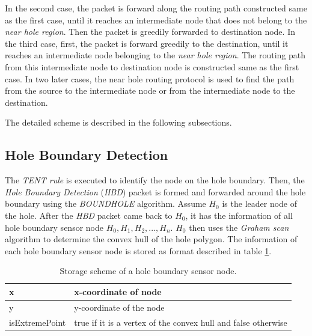 In the second case, the packet is forward along the routing path constructed same as the first case, until it reaches an intermediate node that does not belong to the \emph{near hole region}. Then the packet is greedily forwarded to destination node. In the third case, first, the packet is forward greedily to the destination, until it reaches an intermediate node belonging to the \emph{near hole region}. The routing path from this intermediate node to destination node is constructed same as the first case. In two later cases, the near hole routing protocol is used to find the path from the source to the intermediate node or from the intermediate node to the destination.

The detailed scheme is described in the following subsections.

\subsection{Hole Boundary Detection}
The \emph{TENT rule} is executed to identify the node on the hole boundary. Then, the \emph{Hole Boundary Detection} (\emph{HBD}) packet is formed and forwarded around the hole boundary using the \emph{BOUNDHOLE} algorithm. Assume $H_0$ is the leader node of the hole. After the \emph{HBD} packet came back to $H_0$, it has the information of all hole boundary sensor node $H_0, H_1, H_2, ..., H_n$. $H_0$ then uses the \emph{Graham scan} algorithm to determine the convex hull of the hole polygon. The information of each hole boundary sensor node is stored as format described in table \ref{table-node-info}.

\begin{table}[!htb]
\centering
\caption{Storage scheme of a hole boundary sensor node.}
\label{table-node-info}
\begin{tabular}{|l|l|}
\hline
x              & x-coordinate of node                                          \\ \hline
y              & y-coordinate of the node                                      \\ \hline
isExtremePoint & true if it is a vertex of the convex hull and false otherwise \\ \hline
\end{tabular}
\end{table}

